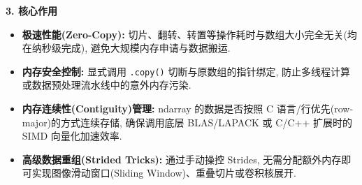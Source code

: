 \documentclass[11pt]{article}
\providecommand{\tightlist}{%
      \setlength{\itemsep}{0pt}\setlength{\parskip}{0pt}}
\begin{document}
\textbf{3. 核心作用}

\begin{itemize}
\tightlist
\item
  \textbf{极速性能(Zero-Copy):}
  切片、翻转、转置等操作耗时与数组大小完全无关(均在纳秒级完成),
  避免大规模内存申请与数据搬运.
\item
  \textbf{内存安全控制:} 显式调用 \texttt{.copy()}
  切断与原数组的指针绑定,
  防止多线程计算或数据预处理流水线中的意外内存污染.
\item
  \textbf{内存连续性(Contiguity)管理:} ndarray 的数据是否按照 C
  语言/行优先(row-major)的方式连续存储, 确保调用底层 BLAS/LAPACK 或
  C/C++ 扩展时的 SIMD 向量化加速效率.
\item
  \textbf{高级数据重组(Strided Tricks):} 通过手动操控 Strides,
  无需分配额外内存即可实现图像滑动窗口(Sliding
  Window)、重叠切片或卷积核展开.
\end{itemize}
\end{document}
